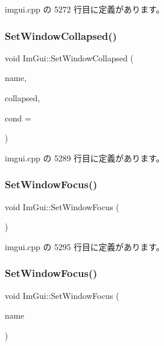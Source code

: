  imgui.\+cpp の 5272 行目に定義があります。

\mbox{\label{namespace_im_gui_ac349187d6aae141cd3b4476e54bcc338}} 
\subsubsection{\texorpdfstring{Set\+Window\+Collapsed()}{SetWindowCollapsed()}\hspace{0.1cm}{\footnotesize\ttfamily [2/2]}}
{\footnotesize\ttfamily void Im\+Gui\+::\+Set\+Window\+Collapsed (\begin{DoxyParamCaption}\item[{const char $\ast$}]{name,  }\item[{bool}]{collapsed,  }\item[{\mbox{\hyperlink{imgui_8h_aef890d6ac872e12c5804d0b3e4f7f103}{Im\+Gui\+Cond}}}]{cond = {} }\end{DoxyParamCaption})}



 imgui.\+cpp の 5289 行目に定義があります。

\mbox{\label{namespace_im_gui_ac71920931ed7b7c8594ee84c6a94e7b8}} 
\subsubsection{\texorpdfstring{Set\+Window\+Focus()}{SetWindowFocus()}\hspace{0.1cm}{\footnotesize\ttfamily [1/2]}}
{\footnotesize\ttfamily void Im\+Gui\+::\+Set\+Window\+Focus (\begin{DoxyParamCaption}{ }\end{DoxyParamCaption})}



 imgui.\+cpp の 5295 行目に定義があります。

\mbox{\label{namespace_im_gui_aa612adbb975051090898f094a1608f24}} 
\subsubsection{\texorpdfstring{Set\+Window\+Focus()}{SetWindowFocus()}\hspace{0.1cm}{\footnotesize\ttfamily [2/2]}}
{\footnotesize\ttfamily void Im\+Gui\+::\+Set\+Window\+Focus (\begin{DoxyParamCaption}\item[{const char $\ast$}]{name }\end{DoxyParamCaption})}




